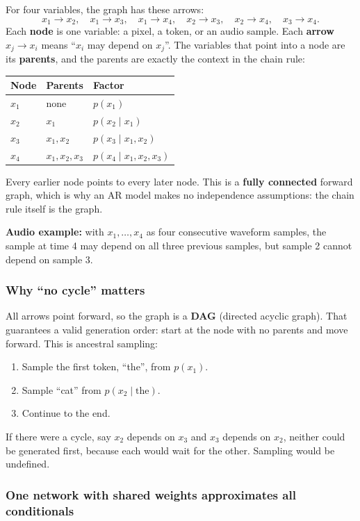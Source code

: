 For four variables, the graph has these arrows:
\[
x_1 \to x_2,\quad x_1 \to x_3,\quad x_1 \to x_4,\quad x_2 \to x_3,\quad x_2 \to x_4,\quad x_3 \to x_4.
\]
Each \textbf{node} is one variable: a pixel, a token, or an audio sample. Each \textbf{arrow} $x_j \to x_i$ means ``$x_i$ may depend on $x_j$''. The variables that point into a node are its \textbf{parents}, and the parents are exactly the context in the chain rule:

\begin{tabular}{lll}
\toprule
Node & Parents & Factor \\
\midrule
$x_1$ & none & $p(x_1)$ \\
$x_2$ & $x_1$ & $p(x_2 \mid x_1)$ \\
$x_3$ & $x_1, x_2$ & $p(x_3 \mid x_1, x_2)$ \\
$x_4$ & $x_1, x_2, x_3$ & $p(x_4 \mid x_1, x_2, x_3)$ \\
\bottomrule
\end{tabular}

Every earlier node points to every later node. This is a \textbf{fully connected} forward graph, which is why an AR model makes no independence assumptions: the chain rule itself is the graph.

\textbf{Audio example:} with $x_1,\dots,x_4$ as four consecutive waveform samples, the sample at time 4 may depend on all three previous samples, but sample 2 cannot depend on sample 3.

\subsubsection*{Why ``no cycle'' matters}

All arrows point forward, so the graph is a \textbf{DAG} (directed acyclic graph). That guarantees a valid generation order: start at the node with no parents and move forward. This is ancestral sampling:
\begin{enumerate}
  \item Sample the first token, ``the'', from $p(x_1)$.
  \item Sample ``cat'' from $p(x_2 \mid \text{the})$.
  \item Continue to the end.
\end{enumerate}
If there were a cycle, say $x_2$ depends on $x_3$ and $x_3$ depends on $x_2$, neither could be generated first, because each would wait for the other. Sampling would be undefined.

\subsubsection*{One network with shared weights approximates all conditionals}

